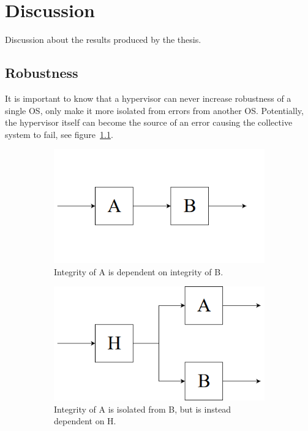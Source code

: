 \chapter{Discussion}
Discussion about the results produced by the thesis.

\section{Robustness}
It is important to know that a hypervisor can never increase robustness of a single OS, only make it more isolated from errors from another OS. Potentially, the hypervisor itself can become the source of an error causing the collective system to fail, see figure~\ref{fig:monitor}.

\begin{figure}[H]
\centering
\begin{subfigure}[b]{0.45\textwidth}
\includegraphics[width=\textwidth]{./img/discussion_nomonitor.png}
\caption{Integrity of A is dependent on integrity of B.}
\end{subfigure}
\begin{subfigure}[b]{0.45\textwidth}
\includegraphics[width=\textwidth]{./img/discussion_monitor.png}
\caption{Integrity of A is isolated from B, but is instead dependent on H.}
\end{subfigure}
\caption{}
\label{fig:monitor}
\end{figure}

